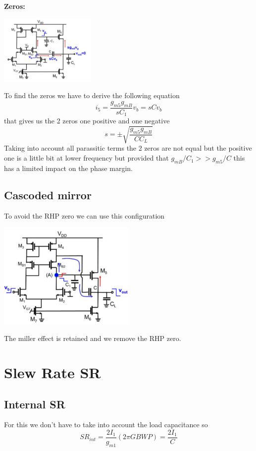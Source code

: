 {\bf Zeros:}

\centering
\includegraphics[width=0.35\textwidth]{cascodezeros.png}\\
\raggedright

To find the zeros we have to derive the following equation
\begin{equation}
i_5=\frac{g_{m5}g_{mB}}{sC_1}v_b=sCv_b
\end{equation}
that gives us the 2 zeros one positive and one negative
\begin{equation}
s=\pm \sqrt{\frac{g_{m5}g_{mB}}{CC_L}}
\end{equation}
Taking into account all parassitic terms the 2 zeros are not equal but the positive one is a little bit at lower frequency but provided that $g_{mB}/C_1>>g_{m5}/C$ this has a limited impact on the phase margin. 

\subsection{Cascoded mirror}
To avoid the RHP zero we can use this configuration

\centering
\includegraphics[width=0.5\textwidth]{cascodedmirror.png}\\
\raggedright

The miller effect is retained and we remove the RHP zero.

\section{Slew Rate SR}

\subsection{Internal SR}
For this we don't have to take into account the load capacitance so
\begin{equation}
SR_{int}=\frac{2I_1}{g_{m1}}(2\pi GBWP)=\frac{2I_1}{C}
\end{equation}

